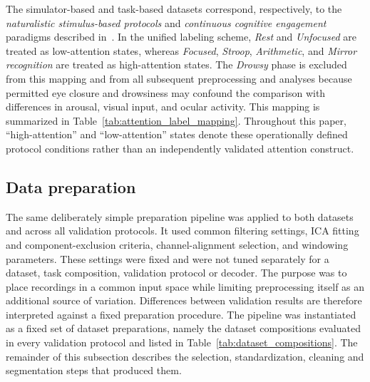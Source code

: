\documentclass[10pt,letterpaper]{article}
\newcommand{\rev}[1]{#1}
\begin{document}
The simulator-based and task-based datasets correspond, respectively, to the \textit{naturalistic stimulus-based protocols} and \textit{continuous cognitive engagement} paradigms described in~\cite{chen2025hybrid}. In the unified labeling scheme, \textit{Rest} and \textit{Unfocused} are treated as low-attention states, whereas \textit{Focused}, \textit{Stroop}, \textit{Arithmetic}, and \textit{Mirror recognition} are treated as high-attention states. The \textit{Drowsy} phase is excluded from this mapping and from all subsequent preprocessing and analyses because permitted eye closure and drowsiness may confound the comparison with differences in arousal, visual input, and ocular activity. This mapping is summarized in Table~\ref{tab:attention_label_mapping}. \rev{Throughout this paper, ``high-attention'' and ``low-attention'' states denote these operationally defined protocol conditions rather than an independently validated attention construct.}


\FloatBarrier

\subsection*{Data preparation}

\rev{The same deliberately simple preparation pipeline was applied to
both datasets and across all validation protocols. It used common filtering
settings, ICA fitting and component-exclusion criteria, channel-alignment
selection, and windowing parameters. These settings were fixed and were not tuned
separately for a dataset, task composition, validation protocol or decoder. The
purpose was to place recordings in a common input space while limiting
preprocessing itself as an additional source of variation. Differences between
validation results are therefore interpreted against a fixed preparation
procedure. The pipeline was instantiated as a fixed set of dataset
preparations, namely the dataset compositions evaluated in every validation
protocol and listed in
Table~\ref{tab:dataset_compositions}. The remainder of this subsection
describes the selection, standardization, cleaning and segmentation steps that
produced them.}


\end{document}
